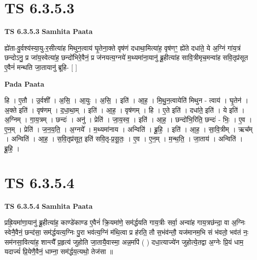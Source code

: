 \documentclass[17pt]{extarticle}
\begin{document}
\section{ TS 6.3.5.3 }

\textbf{TS 6.3.5.3 } \newline
\textbf{Samhita Paata} \newline

ह्ये॑ता-वु॒र्वश्य॑स्या॒यु-र॒सीत्या॑ह मिथुन॒त्वाय॑ घृ॒तेना॒क्ते वृष॑णं दधाथा॒मित्या॑ह॒ वृष॑णꣳ॒॒ ह्ये॑ते दधा॑ते॒ ये अ॒ग्निं गा॑य॒त्रं छन्दोऽनु॒ प्र जा॑य॒स्वेत्या॑ह॒ छन्दो॑भिरे॒वैनं॒ प्र ज॑नयत्य॒ग्नये॑ म॒थ्यमा॑ना॒यानु॑ ब्रू॒हीत्या॑ह सावि॒त्रीमृच॒मन्वा॑ह सवि॒तृप्र॑सूत ए॒वैनं॑ मन्थति जा॒तायानु॑ ब्रूहि- [  ] \newline

\textbf{Pada Paata} \newline

हि । ए॒तौ । उ॒र्वशी᳚ । अ॒सि॒ । आ॒युः । अ॒सि॒ । इति॑ । आ॒ह॒ । मि॒थु॒न॒त्वायेति॑ मिथुन - त्वाय॑ । घृ॒तेन॑ । अ॒क्ते इति॑ । वृष॑णम् । द॒धा॒था॒म् । इति॑ । आ॒ह॒ । वृष॑णम् । हि । ए॒ते इति॑ । दधा॑ते॒ इति॑ । ये इति॑ । अ॒ग्निम् । गा॒य॒त्रम् । छन्दः॑ । अनु॑ । प्रेति॑ । जा॒य॒स्व॒ । इति॑ । आ॒ह॒ । छन्दो॑भि॒रिति॒ छन्दः॑ - भिः॒ । ए॒व । ए॒न॒म् । प्रेति॑ । ज॒न॒य॒ति॒ । अ॒ग्नये᳚ । म॒थ्यमा॑नाय । अन्विति॑ । ब्रू॒हि॒ । इति॑ । आ॒ह॒ । सा॒वि॒त्रीम् । ऋच᳚म् । अन्विति॑ । आ॒ह॒ । स॒वि॒तृप्र॑सूत॒ इति॑ सवि॒तृ-प्र॒सू॒तः॒ । ए॒व । ए॒न॒म् । म॒न्थ॒ति॒ । जा॒ताय॑ । अन्विति॑ । ब्रू॒हि॒ ।  \newline





\section{ TS 6.3.5.4 }

\textbf{TS 6.3.5.4 } \newline
\textbf{Samhita Paata} \newline

प्रह्रि॒यमा॑णा॒यानु॑ ब्रू॒हीत्या॑ह॒ काण्डे॑काण्ड ए॒वैनं॑ क्रि॒यमा॑णे॒ सम॑र्द्धयति गाय॒त्रीः सर्वा॒ अन्वा॑ह गाय॒त्रछ॑न्दा॒ वा अ॒ग्निः स्वेनै॒वैनं॒ छन्द॑सा॒ सम॑र्द्धयत्य॒ग्निः पु॒रा भव॑त्य॒ग्निं म॑थि॒त्वा प्र ह॑रति॒ तौ स॒भंव॑न्तौ॒ यज॑मानम॒भि सं भ॑वतो॒ भव॑तं नः॒ सम॑नसा॒वित्या॑ह॒ शान्त्यै᳚ प्र॒हृत्य॑ जुहोति जा॒तायै॒वास्मा॒ अन्न॒मपि॑ ( ) दधा॒त्याज्ये॑न जुहोत्ये॒तद्वा अ॒ग्नेः प्रि॒यं धाम॒ यदाज्यं॑ प्रि॒येणै॒वैनं॒ धाम्ना॒ सम॑र्द्धय॒त्यथो॒ तेज॑सा ॥ \newline
\end{document}
